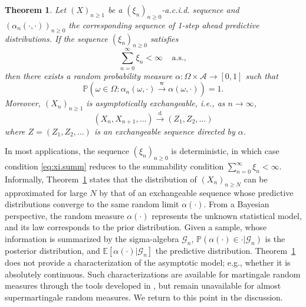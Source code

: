 \documentclass{article}
\newtheorem{theorem}{Theorem}
\theoremstyle{definition}
\renewcommand{\&}{and}
\newcommand{\seq}[1]{({#1})_{n \geq 0}}
\begin{document}
\begin{theorem} \label{thm:asym.exch}
    Let $(X)_{n\geq 1}$ be a $(\xi_{n})_{n\geq 0}$-a.c.i.d. sequence  and $\seq{\alpha_n(\cdot,\cdot)}$ the corresponding sequence of 1-step ahead predictive distributions. If  the sequence $(\xi_{n})_{n\geq 0}$  satisfies\begin{equation} \label{eq:xi.summ}
        \sum_{n=0}^\infty  \xi_n  < \infty \ \ \ \ \ \text{a.s.},
    \end{equation} then there exists a random probability measure $\alpha:\Omega \times \mathcal{A} \to [0,1]$ such that  \begin{equation*}
      \mathbb{P}(\omega\in \Omega: \alpha_n(\omega,\cdot)\stackrel{\text{w}}{\to}  \alpha(\omega,\cdot))=1.
      \end{equation*}
Moreover, $(X_{n})_{n\geq 1}$ is asymptotically exchangeable, i.e., as $n\to\infty$,
\begin{equation*}
    (X_{n},X_{n+1},\ldots) \stackrel{\text{d}}{\to} (Z_{1},Z_{2},\ldots)
\end{equation*}
where $Z=(Z_{1},Z_{2},\ldots)$ is an exchangeable sequence directed by $\alpha$.
\end{theorem}

In most applications, the sequence $(\xi_{n})_{n\geq 0}$ is deterministic, in which case condition \eqref{eq:xi.summ} reduces to the summability condition $\sum_{n=0}^{\infty} \xi_{n} < \infty$. Informally, Theorem~\ref{thm:asym.exch} states that the distribution of $(X_n)_{n\geq N}$  can be approximated for large $N$ by that of an exchangeable sequence whose predictive distributions converge to the same random limit $\alpha(\cdot)$. %
From a Bayesian perspective, the random measure $\alpha(\cdot)$ represents the unknown statistical model, and its law corresponds to the prior distribution. Given a sample, whose information is summarized by the sigma-algebra $\mathcal{G}_n$, $\mathbb{P}(\alpha(\cdot)\in \cdot | \mathcal{G}_n)$ is the posterior distribution, and  $\mathbb{E}[\alpha(\cdot) | \mathcal{G}_n]$ the predictive distribution. %
Theorem~\ref{thm:asym.exch} does not provide a characterization of the asymptotic model; e.g., whether it is absolutely continuous. Such characterizations are available for martingale random measures through the tools developed in \cite{berti2013exchangeable}, but remain unavailable for almost supermartingale random measures. We return to this point in the discussion.
\end{document}
